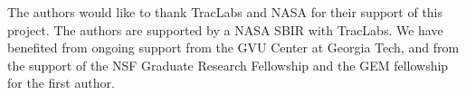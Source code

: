 \documentclass[sigconf]{acmart}
\begin{document}
%


\begin{acks}
  The authors would like to thank 
  TracLabs and NASA for their support of this project.  The authors are supported by a NASA SBIR with TracLabs.
We have benefited from ongoing support from the GVU Center at Georgia Tech, and from the support of the NSF Graduate Research Fellowship and the GEM fellowship for the first author.
\end{acks}

%



% 





\end{document}
